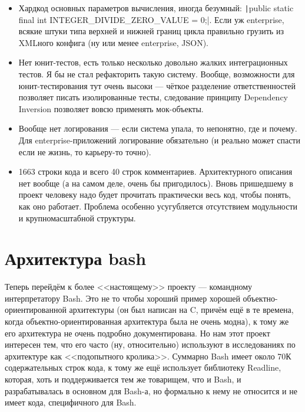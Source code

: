 \documentclass[a5paper]{article}
\begin{document}
\begin{itemize}
    \item Хардкод основных параметров вычисления, иногда безумный: \texttt|public static final int INTEGER_DIVIDE_ZERO_VALUE = 0;|. Если уж enterprise, всякие штуки типа верхней и нижней границ цикла правильно грузить из XMLного конфига (ну или менее enterprise, JSON).
    \item Нет юнит-тестов, есть только несколько довольно жалких интеграционных тестов. Я бы не стал рефакторить такую систему. Вообще, возможности для юнит-тестирования тут очень высоки --- чёткое разделение ответственностей позволяет писать изолированные тесты, следование принципу Dependency Inversion позволяет вовсю применять мок-объекты.
    \item Вообще нет логирования --- если система упала, то непонятно, где и почему. Для enterprise-приложений логирование обязательно (и реально может спасти если не жизнь, то карьеру-то точно).
    \item 1663 строки кода и всего 40 строк комментариев. Архитектурного описания нет вообще (а на самом деле, очень бы пригодилось). Вновь пришедшему в проект человеку надо будет прочитать практически весь код, чтобы понять, как оно работает. Проблема особенно усугубляется отсутствием модульности и крупномасштабной структуры.
\end{itemize}

\section{Архитектура bash}

Теперь перейдём к более <<настоящему>> проекту --- командному интерпретатору Bash. Это не то чтобы хороший пример хорошей объектно-ориентированной архитектуры (он был написан на C, причём ещё в те времена, когда объектно-ориентированная архитектура была не очень модна), к тому же его архитектура не очень подробно документирована. Но нам этот проект интересен тем, что его часто (ну, относительно) используют в исследованиях по архитектуре как <<подопытного кролика>>. Суммарно Bash имеет около 70К содержательных строк кода, к тому же ещё использует библиотеку Readline, которая, хоть и поддерживается тем же товарищем, что и Bash, и разрабатывалась в основном для Bash-а, но формально к нему не относится и не имеет кода, специфичного для Bash.
\end{document}
